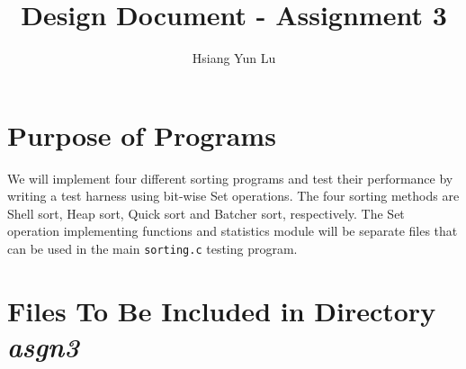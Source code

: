 \documentclass[12pt]{article}
\title{Design Document - Assignment 3}
\author{Hsiang Yun Lu}
\begin{document}
\maketitle

\section{Purpose of Programs}

We will implement four different sorting programs and test their performance by writing a test harness using bit-wise Set operations. The four sorting methods are Shell sort, Heap sort, Quick sort and Batcher sort, respectively. The Set operation implementing functions and statistics module will be separate files that can be used in the main \texttt{sorting.c} testing program.

\section{Files To Be Included in Directory \textit{asgn3}}
\end{document}
